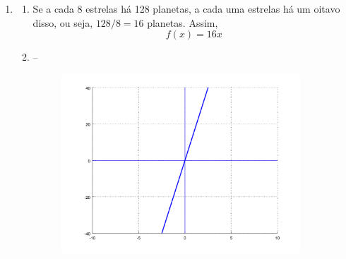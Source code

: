 \documentclass[11pt]{article}
\begin{document}
\begin{enumerate}
	\item 
	\begin{enumerate}
		\item Se a cada 8 estrelas há 128 planetas, a cada uma estrelas há um
			oitavo disso, ou seja, $128/8 = 16$ planetas. Assim,
			$$f(x) = 16x$$
		\item -- 
			\begin{figure}[H]
				\centering
				\includegraphics[width=0.9\textwidth]{imgs/ex4c.png}
			\end{figure}
	\end{enumerate}
\end{enumerate}
\end{document}
